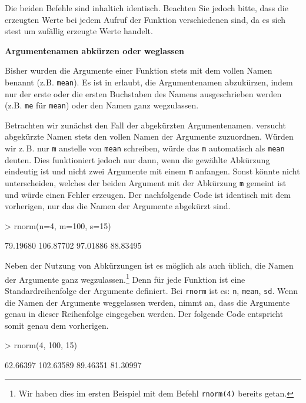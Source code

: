 Die beiden Befehle sind inhaltich identisch. Beachten Sie jedoch bitte, dass die erzeugten Werte bei jedem Aufruf der Funktion verschiedenen sind, da es sich stest um zufällig erzeugte Werte handelt.   
        

\vspace*{5mm}
\textbf{Argumentenamen abkürzen oder weglassen}       

Bisher wurden die Argumente einer Funktion stets mit dem vollen Namen benannt (z.B. \texttt{mean}). Es ist in \R{} erlaubt, die Argumentenamen abzukürzen, indem nur der erste oder die ersten Buchstaben des Namens ausgeschrieben werden (z.B. \texttt{me} für \texttt{mean}) oder den Namen ganz wegzulassen. 

Betrachten wir zunächst den Fall der abgekürzten Argumentenamen. \R{} versucht abgekürzte Namen stets den vollen Namen der Argumente zuzuordnen. Würden wir z.\,B. nur \verb!m! anstelle von \verb!mean! schreiben, würde \R{} das \verb!m! automatisch als \verb!mean! deuten. Dies funktioniert jedoch nur dann, wenn die gewählte Abkürzung eindeutig ist und nicht zwei Argumente mit einem \verb!m! anfangen. Sonst könnte \R{} nicht unterscheiden, welches der beiden Argument mit der Abkürzung \verb!m! gemeint ist und würde einen Fehler erzeugen. Der nachfolgende Code ist identisch mit dem vorherigen, nur das die Namen der Argumente abgekürzt sind.  

\begin{Schunk}
\begin{Sinput}
> rnorm(n=4, m=100, s=15)
\end{Sinput}
\begin{Soutput}
[1]  79.19680 106.87702  97.01886  88.83495
\end{Soutput}
\end{Schunk}

Neben der Nutzung von Abkürzungen ist es möglich als auch üblich, die Namen der Argumente ganz wegzulassen.\footnote{Wir haben dies im ersten Beispiel mit dem Befehl \texttt{rnorm(4)} bereits getan.} Denn für jede Funktion ist eine Standardreihenfolge der Argumente definiert. Bei \verb!rnorm! ist es: \verb!n!, \verb!mean!, \verb!sd!. Wenn die Namen der Argumente weggelassen werden, nimmt \R{} an, dass die Argumente genau in dieser Reihenfolge eingegeben werden. Der folgende Code entspricht somit genau dem vorherigen.

\begin{Schunk}
\begin{Sinput}
> rnorm(4, 100, 15)
\end{Sinput}
\begin{Soutput}
[1]  62.66397 102.63589  89.46351  81.30997
\end{Soutput}
\end{Schunk}

